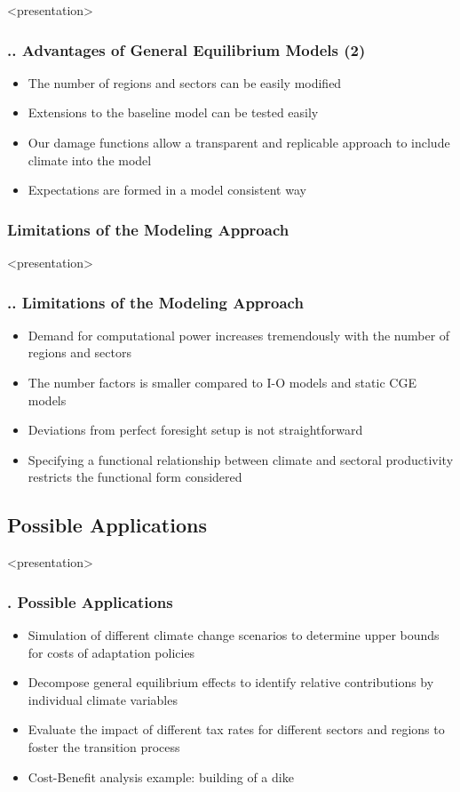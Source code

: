 \documentclass[11pt,aspectratio=169]{beamer}
\begin{document}
\begin{frame}<presentation>
	\frametitle{{\thesection.\thesubsection.\thesubsubsection}  Advantages of General Equilibrium Models (2)}
		\begin{itemize}
		\item The number of regions and sectors can be easily modified
		\item Extensions to the baseline model can be tested easily
		\item Our damage functions allow a transparent and replicable approach to include climate into the model
		\item Expectations are formed in a model consistent way
		\end{itemize}
\end{frame} 
	

	
	
\subsubsection{Limitations of the Modeling Approach}
\begin{frame}<presentation>
	\frametitle{{\thesection.\thesubsection.\thesubsubsection} Limitations of the Modeling Approach}
		\begin{itemize}
			\item Demand for computational power increases tremendously with the number of regions and sectors 
			\item The number factors is smaller compared to I-O models and static CGE models
			\item Deviations from perfect foresight setup is not straightforward
			\item Specifying a functional relationship between climate and sectoral productivity restricts the functional form considered
		\end{itemize}
	\end{frame} 	
	
\subsection{Possible Applications}
\begin{frame}<presentation>
	\frametitle{{\thesection.\thesubsection} Possible Applications}
	\begin{itemize}
		\item Simulation of different climate change scenarios to determine upper bounds for costs of adaptation policies
		\item Decompose general equilibrium effects to identify relative contributions by individual climate variables
		\item Evaluate the impact of different tax rates for different sectors and regions to foster the transition process
		\item Cost-Benefit analysis example: building of a dike	
	\end{itemize}
\end{frame}
\end{document}
